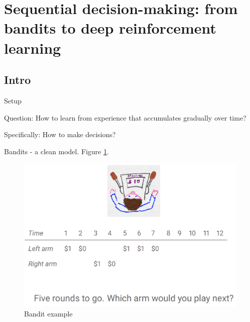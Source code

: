 \documentclass[english]{article}
\begin{document}
\eenum






\section{Sequential decision-making: from bandits to deep reinforcement learning}

\subsection{Intro}

\benum

\item {Setup}
\bitem
\item Question: How to learn from experience that accumulates gradually over time?

\item Specifically: How to make decisions?

\eitem




\item {Bandits - a clean model}. Figure \ref{band_ex}.
\begin{figure}[h!]
\begin{center}
\includegraphics[width=0.4\paperwidth]{bandits}
    \caption{Bandit example}
    \label{band_ex}
\end{center}
\end{figure}
\end{document}
